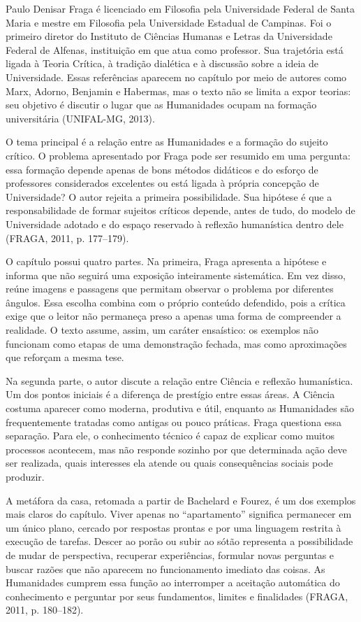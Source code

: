 \documentclass[12pt,a4paper]{article}
\begin{document}
Paulo Denisar Fraga é licenciado em Filosofia pela Universidade Federal de Santa Maria e mestre em Filosofia pela Universidade Estadual de Campinas. Foi o primeiro diretor do Instituto de Ciências Humanas e Letras da Universidade Federal de Alfenas, instituição em que atua como professor. Sua trajetória está ligada à Teoria Crítica, à tradição dialética e à discussão sobre a ideia de Universidade. Essas referências aparecem no capítulo por meio de autores como Marx, Adorno, Benjamin e Habermas, mas o texto não se limita a expor teorias: seu objetivo é discutir o lugar que as Humanidades ocupam na formação universitária (UNIFAL-MG, 2013).

O tema principal é a relação entre as Humanidades e a formação do sujeito crítico. O problema apresentado por Fraga pode ser resumido em uma pergunta: essa formação depende apenas de bons métodos didáticos e do esforço de professores considerados excelentes ou está ligada à própria concepção de Universidade? O autor rejeita a primeira possibilidade. Sua hipótese é que a responsabilidade de formar sujeitos críticos depende, antes de tudo, do modelo de Universidade adotado e do espaço reservado à reflexão humanística dentro dele (FRAGA, 2011, p. 177--179).

O capítulo possui quatro partes. Na primeira, Fraga apresenta a hipótese e informa que não seguirá uma exposição inteiramente sistemática. Em vez disso, reúne imagens e passagens que permitam observar o problema por diferentes ângulos. Essa escolha combina com o próprio conteúdo defendido, pois a crítica exige que o leitor não permaneça preso a apenas uma forma de compreender a realidade. O texto assume, assim, um caráter ensaístico: os exemplos não funcionam como etapas de uma demonstração fechada, mas como aproximações que reforçam a mesma tese.

Na segunda parte, o autor discute a relação entre Ciência e reflexão humanística. Um dos pontos iniciais é a diferença de prestígio entre essas áreas. A Ciência costuma aparecer como moderna, produtiva e útil, enquanto as Humanidades são frequentemente tratadas como antigas ou pouco práticas. Fraga questiona essa separação. Para ele, o conhecimento técnico é capaz de explicar como muitos processos acontecem, mas não responde sozinho por que determinada ação deve ser realizada, quais interesses ela atende ou quais consequências sociais pode produzir.

A metáfora da casa, retomada a partir de Bachelard e Fourez, é um dos exemplos mais claros do capítulo. Viver apenas no ``apartamento'' significa permanecer em um único plano, cercado por respostas prontas e por uma linguagem restrita à execução de tarefas. Descer ao porão ou subir ao sótão representa a possibilidade de mudar de perspectiva, recuperar experiências, formular novas perguntas e buscar razões que não aparecem no funcionamento imediato das coisas. As Humanidades cumprem essa função ao interromper a aceitação automática do conhecimento e perguntar por seus fundamentos, limites e finalidades (FRAGA, 2011, p. 180--182).
\end{document}
